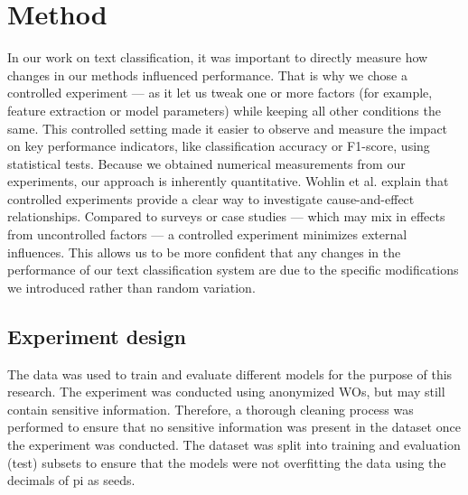 \section{Method}
%
%
%
In our work on text classification, it was important to directly measure how changes in our methods influenced performance. That is why we chose a controlled experiment --- as it let us tweak one or more factors (for example, feature extraction or model parameters) while keeping all other conditions the same. This controlled setting made it easier to observe and measure the impact on key performance indicators, like classification accuracy or F1-score, using statistical tests. Because we obtained numerical measurements from our experiments, our approach is inherently quantitative.
Wohlin et al. \cite{wohlin2000} explain that controlled experiments provide a clear way to investigate cause-and-effect relationships. Compared to surveys or case studies --- which may mix in effects from uncontrolled factors --- a controlled experiment minimizes external influences. This allows us to be more confident that any changes in the performance of our text classification system are due to the specific modifications we introduced rather than random variation.

\subsection{Experiment design}
%
%
%
%


The data was used to train and evaluate different models for the purpose of this research. The experiment was conducted using anonymized WOs, but may still contain sensitive information. Therefore, a thorough cleaning process was performed to ensure that no sensitive information was present in the dataset once the experiment was conducted. The dataset was split into training and evaluation (test) subsets to ensure that the models were not overfitting the data using the decimals of pi as seeds.

